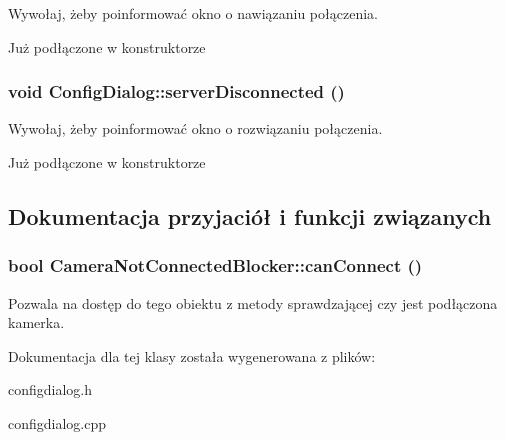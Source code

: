 Wywołaj, żeby poinformować okno o nawiązaniu połączenia. 

Już podłączone w konstruktorze \hypertarget{class_config_dialog_7782fa76c40b70438677baff0c2622f2}{
\subsubsection[{serverDisconnected}]{\setlength{\rightskip}{0pt plus 5cm}void ConfigDialog::serverDisconnected ()}}
\label{class_config_dialog_7782fa76c40b70438677baff0c2622f2}


Wywołaj, żeby poinformować okno o rozwiązaniu połączenia. 

Już podłączone w konstruktorze 

\subsection{Dokumentacja przyjaciół i funkcji związanych}
\hypertarget{class_config_dialog_3b0963bb150b18a9cbd3b46187f7ea26}{
\subsubsection[{CameraNotConnectedBlocker::canConnect}]{\setlength{\rightskip}{0pt plus 5cm}bool CameraNotConnectedBlocker::canConnect ()}}
\label{class_config_dialog_3b0963bb150b18a9cbd3b46187f7ea26}


Pozwala na dostęp do tego obiektu z metody sprawdzającej czy jest podłączona kamerka. 

Dokumentacja dla tej klasy została wygenerowana z plików:\begin{CompactItemize}
\item 
configdialog.h\item 
configdialog.cpp\end{CompactItemize}
